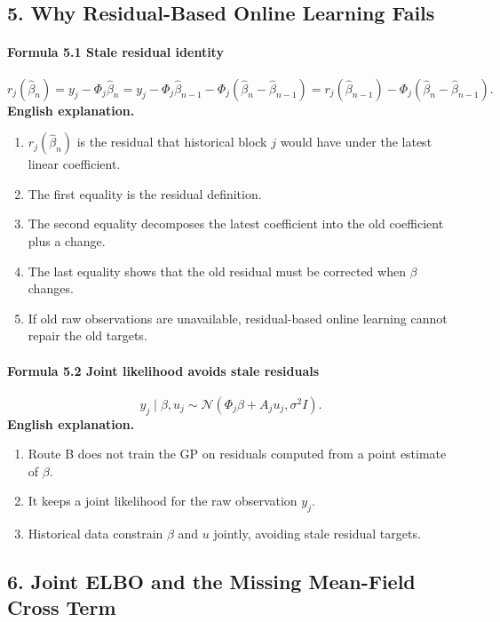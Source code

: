 \documentclass[12pt]{article}
\begin{document}
\subsection{5. Why Residual-Based Online Learning Fails}
\paragraph{Formula 5.1 Stale residual identity}
\[
r_j(\hat\beta_n)
=y_j-\Phi_j\hat\beta_n
=y_j-\Phi_j\hat\beta_{n-1}-\Phi_j(\hat\beta_n-\hat\beta_{n-1})
=r_j(\hat\beta_{n-1})-\Phi_j(\hat\beta_n-\hat\beta_{n-1}).
\]
\textbf{English explanation.}
\begin{enumerate}[leftmargin=2em]
\item \(r_j(\hat\beta_n)\) is the residual that historical block \(j\) would have under the latest linear coefficient.
\item The first equality is the residual definition.
\item The second equality decomposes the latest coefficient into the old coefficient plus a change.
\item The last equality shows that the old residual must be corrected when \(\beta\) changes.
\item If old raw observations are unavailable, residual-based online learning cannot repair the old targets.
\end{enumerate}

\paragraph{Formula 5.2 Joint likelihood avoids stale residuals}
\[
y_j\mid\beta,u_j\sim
\mathcal N(\Phi_j\beta+A_j u_j,\sigma^2 I).
\]
\textbf{English explanation.}
\begin{enumerate}[leftmargin=2em]
\item Route B does not train the GP on residuals computed from a point estimate of \(\beta\).
\item It keeps a joint likelihood for the raw observation \(y_j\).
\item Historical data constrain \(\beta\) and \(u\) jointly, avoiding stale residual targets.
\end{enumerate}

\subsection{6. Joint ELBO and the Missing Mean-Field Cross Term}
\end{document}
